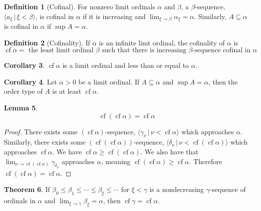 \documentclass{article}
\theoremstyle{definition}
\newtheorem{thm}{Theorem}[section]
\newtheorem{crly}[thm]{Corollary}
\newtheorem{defn}[thm]{Definition}
\newtheorem{lmma}[thm]{Lemma}
\DeclareMathOperator{\cf}{cf}
\begin{document}
\newpage

\begin{defn}[Cofinal]
    For nonzero limit ordinals $\alpha$ and $\beta$, a $\beta$-sequence, $\langle a_\xi \, | \, \xi < \beta \rangle$, is cofinal in $\alpha$ if it is increasing and $\lim_{\xi \to \beta} \alpha_\xi = \alpha$. Similarly, $A \subseteq \alpha$ is cofinal in $\alpha$ if $\sup A = \alpha$. 
\end{defn}

\begin{defn}[Cofinality]
    If $\alpha$ is an infinite limt ordinal, the cofinality of $\alpha$ is 
    \[
        \cf \alpha = \text{ the least limit ordinal $\beta$ such that there is increasing $\beta$-sequence cofinal in $\alpha$}
    \]
\end{defn}

\begin{crly}
    $\cf \alpha$ is a limit ordinal and less than or equal to $\alpha$.
\end{crly}

\begin{crly}
    Let $\alpha > 0$ be a limit ordinal. If $A \subseteq \alpha$ and $\sup A = \alpha$, then the order type of $A$ is at least $\cf \alpha$. 
\end{crly}

\begin{lmma}
    \[
        \cf(\cf \alpha) = \cf \alpha    
    \]
\end{lmma}

\begin{proof}
    There exists some $(\cf \alpha)$-sequence, $\langle \gamma_\nu \, | \, \nu < \cf \alpha \rangle$ which approaches $\alpha$. Similarly, there exists some $(\cf (\cf \alpha))$-sequence, $\langle \delta_\nu \, | \, \nu < \cf (\cf \alpha) \rangle$ which approaches $\cf \alpha$. We have $\cf \alpha \ge \cf (\cf \alpha)$. We also have that $\lim_{\nu \to \cf (\cf \alpha)} \gamma_{\delta_\nu}$ approaches $\alpha$, meaning $\cf (\cf \alpha) \ge \cf \alpha$. Therefore $\cf (\cf \alpha) = \cf \alpha$.
\end{proof}

\begin{thm}
    If $\beta_0 \le \beta_1 \le \cdots \le \beta_\xi \le \cdots$ for $\xi < \gamma$ is a nondecreasing $\gamma$-sequence of ordinals in $\alpha$ and $\lim_{\xi \to \gamma} \beta_\xi = \alpha$, then $\cf \gamma = \cf \alpha$.
\end{thm}
\end{document}

